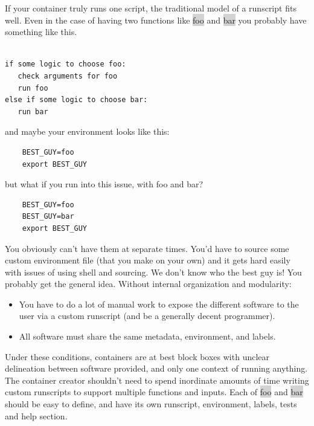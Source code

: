 \documentclass[a4paper]{article}
\newcounter{subsubsubsection}[subsubsection]
\begin{document}
	If your container truly runs one script, the traditional model of a runscript fits well. Even in the case of having two functions like \colorbox{lightgray}{foo} and \colorbox{lightgray}{bar} you probably have something like this.\\[0.1in]
	
\begin{lstlisting}[frame=single]
%runscript

if some logic to choose foo:
   check arguments for foo
   run foo
else if some logic to choose bar:
   run bar  
\end{lstlisting}

and maybe your environment looks like this:
\begin{lstlisting}[frame=single]  
%environment
    BEST_GUY=foo
    export BEST_GUY
\end{lstlisting}
but what if you run into this issue, with foo and bar?\\[0.1in]
\begin{lstlisting}[frame=single]  
%environment
    BEST_GUY=foo
    BEST_GUY=bar
    export BEST_GUY
\end{lstlisting}
    
    You obviously can’t have them at separate times. You’d have to source some custom environment file (that you make on your own) and it gets hard easily with issues of using shell and sourcing. We don’t know who the best guy is! You probably get the general idea. Without internal organization and modularity: \\[0.1in]
    \begin{itemize}
    \item  You have to do a lot of manual work to expose the different software to the user via a custom runscript (and be a generally decent programmer).
    \item All software must share the same metadata, environment, and labels.
    \end{itemize}
    
    Under these conditions, containers are at best block boxes with unclear delineation between software provided, and only one context of running anything. The container creator shouldn’t need to spend inordinate amounts of time writing custom runscripts to support multiple functions and inputs. Each of \colorbox{lightgray}{foo} and \colorbox{lightgray}{bar} should be easy to define, and have its own runscript, environment, labels, tests and help section.
  
\end{document}

